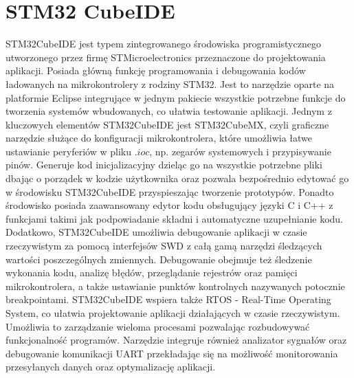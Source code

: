 \section{STM32 CubeIDE}
STM32CubeIDE jest typem zintegrowanego środowiska programistycznego utworzonego przez firmę STMicroelectronics przeznaczone do projektowania aplikacji. Posiada główną funkcję programowania i debugowania kodów ładowanych na mikrokontrolery z rodziny STM32. Jest to narzędzie oparte na platformie Eclipse integrujące w jednym pakiecie wszystkie potrzebne funkcje do tworzenia systemów wbudowanych, co ułatwia testowanie aplikacji. \newline
\noindent Jednym z kluczowych elementów STM32CubeIDE jest STM32CubeMX, czyli graficzne narzędzie służące do konfiguracji mikrokontrolera, które umożliwia łatwe ustawianie peryferiów w pliku $.ioc$, np. zegarów systemowych i przypisywanie pinów. Generuje kod inicjalizacyjny dzieląc go na wszystkie potrzebne pliki dbając o porządek w kodzie użytkownika oraz pozwala bezpośrednio edytować go w środowisku STM32CubeIDE przyspieszając tworzenie prototypów. Ponadto środowisko posiada zaawansowany edytor kodu obsługujący języki C i C++ z funkcjami takimi jak podpowiadanie składni i automatyczne uzupełnianie kodu. Dodatkowo, STM32CubeIDE umożliwia debugowanie aplikacji w czasie rzeczywistym za pomocą interfejsów SWD z całą gamą narzędzi śledzących wartości poszczególnych zmiennych. Debugowanie obejmuje też śledzenie wykonania kodu, analizę błędów, przeglądanie rejestrów oraz pamięci mikrokontrolera, a także ustawianie punktów kontrolnych nazywanych potocznie breakpointami. \newline
\noindent STM32CubeIDE wspiera także RTOS - Real-Time Operating System, co ułatwia projektowanie aplikacji działających w czasie rzeczywistym. Umożliwia to zarządzanie wieloma procesami pozwalając rozbudowywać funkcjonalność programów. Narzędzie integruje również analizator sygnałów oraz debugowanie komunikacji UART przekładając się na możliwość monitorowania przesyłanych danych oraz optymalizację aplikacji.

\newpage


